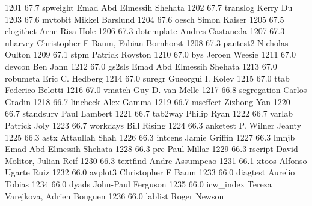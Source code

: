   1201     67.7    spweight      Emad Abd Elmessih Shehata               
  1202     67.7    translog      Kerry Du                                
  1203     67.6    mvtobit       Mikkel Barslund                         
  1204     67.6    oesch         Simon Kaiser                            
  1205     67.5    clogithet     Arne Risa Hole                          
  1206     67.3    dotemplate    Andres Castaneda                        
  1207     67.3    nharvey       Christopher F Baum, Fabian Bornhorst    
  1208     67.3    pantest2      Nicholas Oulton                         
  1209     67.1    stpm          Patrick Royston                         
  1210     67.0    bys           Jeroen Weesie                           
  1211     67.0    devcon        Ben Jann                                
  1212     67.0    gs2sls        Emad Abd Elmessih Shehata               
  1213     67.0    robumeta      Eric C. Hedberg                         
  1214     67.0    suregr        Gueorgui I. Kolev                       
  1215     67.0    ttab          Federico Belotti                        
  1216     67.0    vmatch        Guy D. van Melle                        
  1217     66.8    segregation   Carlos Gradin                           
  1218     66.7    lincheck      Alex Gamma                              
  1219     66.7    mseffect      Zizhong Yan                             
  1220     66.7    standsurv     Paul Lambert                            
  1221     66.7    tab2way       Philip Ryan                             
  1222     66.7    varlab        Patrick Joly                            
  1223     66.7    workdays      Bill Rising                             
  1224     66.3    anketest      P. Wilner Jeanty                        
  1225     66.3    astx          Attaullah Shah                          
  1226     66.3    intcens       Jamie Griffin                           
  1227     66.3    lmnjb         Emad Abd Elmessih Shehata               
  1228     66.3    pre           Paul Millar                             
  1229     66.3    rscript       David Molitor, Julian Reif              
  1230     66.3    textfind      Andre Assumpcao                         
  1231     66.1    xtoos         Alfonso Ugarte Ruiz                     
  1232     66.0    avplot3       Christopher F Baum                      
  1233     66.0    diagtest      Aurelio Tobias                          
  1234     66.0    dyads         John-Paul Ferguson                      
  1235     66.0    icw_index     Tereza Varejkova, Adrien Bouguen        
  1236     66.0    lablist       Roger Newson                            
